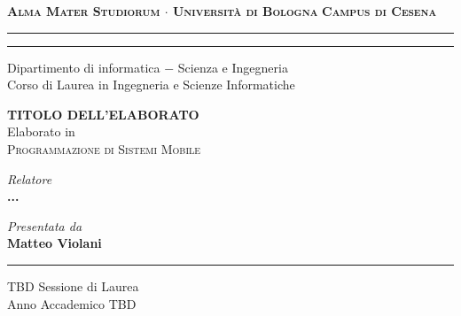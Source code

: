 \begin{titlepage}
    \begin{center}
        {\Large
            \textbf{
                \textsc{Alma Mater Studiorum $\cdot$ Università di Bologna}
            }
        }
        {\large
            \textbf{
                \textsc{Campus di Cesena}
            }
        }
        \rule[0.1cm]{16cm}{0.3mm}
        \rule[0.5cm]{16cm}{0.7mm}
        {\Large
            Dipartimento di informatica $-$ Scienza e Ingegneria \\
        }
        \vspace*{4mm}
        {\Large 
            Corso di Laurea in Ingegneria e Scienze Informatiche
        }
        \vspace*{40mm} %
        \begin{center}
            {\LARGE
                \textbf{
                    TITOLO DELL'ELABORATO \\
                }
            }
            \vspace*{20mm} %
            {\Large
                Elaborato in
            } \\
            \vspace*{3mm}
            {\Large
                \textsc{Programmazione di Sistemi Mobile}
            }
        \end{center}
        \vspace*{45mm}
        \begin{minipage}[t]{0.47\textwidth}
            {\large
                \textit{Relatore} \\
                \textbf{
                    ...
                }
            }
        \end{minipage}
        \begin{minipage}[t]{0.47\textwidth}\raggedleft
            {\large
                \textit{Presentata da} \\
                \textbf{Matteo Violani}
            }
        \end{minipage}
    \end{center}
    \begin{center}
        \vspace*{30mm}
        \rule[0.1cm]{16cm}{0.3mm}
    \end{center}
    \begin{center}
        {\large
            TBD Sessione di Laurea
        } \\
        \vspace*{2mm}
        {\large
            Anno Accademico TBD
        }
    \end{center}
\end{titlepage}
\restoregeometry